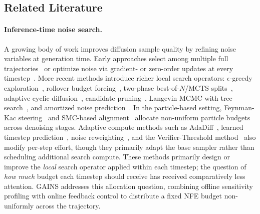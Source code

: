 \subsection{Related Literature}
\label{sec:related-lit}

\paragraph{Inference-time noise search.}
A growing body of work improves diffusion sample quality by refining noise
variables at generation time.
Early approaches select among multiple full
trajectories~\citep{ma2024inference} or optimize noise via gradient- or
zero-order updates at every
timestep~\citep{tang2024dno,qi2024noises,zhou2025golden}.
More recent methods introduce richer local search operators:
$\epsilon$-greedy
exploration~\citep{ramesh2025nts}, rollover budget
forcing~\citep{kim2025rbf}, two-phase best-of-$N$/MCTS
splits~\citep{zhang2025tscend}, adaptive cyclic
diffusion~\citep{lee2025abcd}, candidate
pruning~\citep{ttsnap2025}, Langevin MCMC with tree
search~\citep{zhang2025classical}, and amortized noise
prediction~\citep{eyring2025hypernetworks}.
In the particle-based setting, Feynman-Kac steering~\citep{singhal2025fk}
and SMC-based alignment~\citep{kim2025psi} allocate non-uniform particle
budgets across denoising stages.
Adaptive compute methods such as
AdaDiff~\citep{zhang2025adadiff}, learned timestep
prediction~\citep{ye2025tpdm}, noise
reweighting~\citep{yeh2025demons}, and the Verifier-Threshold
method~\citep{sundaresha2025vt} also modify per-step effort, though they
primarily adapt the base sampler rather than scheduling additional search
compute.
These methods primarily design or improve the \emph{local} search operator
applied within each timestep; the question of \emph{how much} budget
each timestep should receive has received comparatively less attention.
GAINS addresses this allocation question, combining
offline sensitivity profiling with online feedback control to distribute
a fixed NFE budget non-uniformly across the trajectory.

